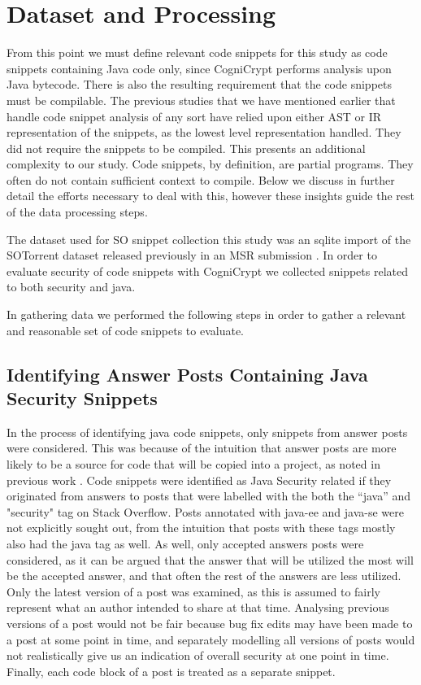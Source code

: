 \documentclass[10pt, conference]{IEEEtran}
\begin{document}
\section{Dataset and Processing}



From this point we must define relevant code snippets for this study as code snippets containing Java code only, since CogniCrypt performs analysis upon Java bytecode. There is also the resulting requirement that the code snippets must be compilable. The previous studies that we have mentioned earlier that handle code snippet analysis of any sort have relied upon either AST or IR representation of the snippets, as the lowest level representation handled. They did not require the snippets to be compiled. This presents an additional complexity to our study. Code snippets, by definition, are partial programs. They often do not contain sufficient context to compile. Below we discuss in further detail the efforts necessary to deal with this, however these insights guide the rest of the data processing steps.

The dataset used for SO snippet collection this study was an sqlite import \cite{wong_2019} of the SOTorrent dataset released previously in an MSR submission \cite{}. In order to evaluate security of code snippets with CogniCrypt we collected snippets related to both security and java. 

In gathering data we performed the following steps in order to gather a relevant and reasonable set of code snippets to evaluate.

\subsection{Identifying Answer Posts Containing Java Security Snippets}
In the process of identifying java code snippets, only snippets from answer posts were considered. This was because of the intuition that answer posts are more likely to be a source for code that will be copied into a project, as noted in previous work \cite{7958574}. Code snippets were identified as Java Security related if they originated from answers to posts that were labelled with the both the “java” and "security" tag on Stack Overflow. Posts annotated with java-ee and java-se were not explicitly sought out, from the intuition that posts with these tags mostly also had the java tag as well. As well, only accepted answers posts were considered, as it can be argued that the answer that will be utilized the most will be the accepted answer, and that often the rest of the answers are less utilized. Only the latest version of a post was examined, as this is assumed to fairly represent what an author intended to share at that time. Analysing previous versions of a post would not be fair because bug fix edits may have been made to a post at some point in time, and separately modelling all versions of posts would not realistically give us an indication of overall security at one point in time. Finally, each code block of a post is treated as a separate snippet.  
\end{document}
